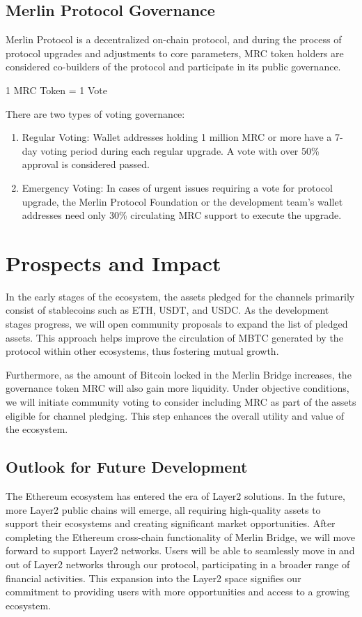 \documentclass{article}
\begin{document}
\subsection{Merlin Protocol Governance}
Merlin Protocol is a decentralized on-chain protocol, and during the process of protocol upgrades and adjustments to core parameters, MRC token holders are considered co-builders of the protocol and participate in its public governance.
\begin{adjustwidth}{4em}{4em}
1 MRC Token = 1 Vote
\end{adjustwidth}
There are two types of voting governance:
\begin{enumerate}
    \item Regular Voting: Wallet addresses holding 1 million MRC or more have a 7-day voting period during each regular upgrade. A vote with over 50\% approval is considered passed.
    \item Emergency Voting: In cases of urgent issues requiring a vote for protocol upgrade, the Merlin Protocol Foundation or the development team's wallet addresses need only 30\% circulating MRC support to execute the upgrade.
\end{enumerate}
\section{Prospects and Impact}
\par In the early stages of the ecosystem, the assets pledged for the channels primarily consist of stablecoins such as ETH, USDT, and USDC. As the development stages progress, we will open community proposals to expand the list of pledged assets. This approach helps improve the circulation of MBTC generated by the protocol within other ecosystems, thus fostering mutual growth.
\par Furthermore, as the amount of Bitcoin locked in the Merlin Bridge increases, the governance token MRC will also gain more liquidity. Under objective conditions, we will initiate community voting to consider including MRC as part of the assets eligible for channel pledging. This step enhances the overall utility and value of the ecosystem.
\subsection{Outlook for Future Development}
\par The Ethereum ecosystem has entered the era of Layer2 solutions. In the future, more Layer2 public chains will emerge, all requiring high-quality assets to support their ecosystems and creating significant market opportunities. After completing the Ethereum cross-chain functionality of Merlin Bridge, we will move forward to support Layer2 networks. Users will be able to seamlessly move in and out of Layer2 networks through our protocol, participating in a broader range of financial activities. This expansion into the Layer2 space signifies our commitment to providing users with more opportunities and access to a growing ecosystem.


\end{document}
